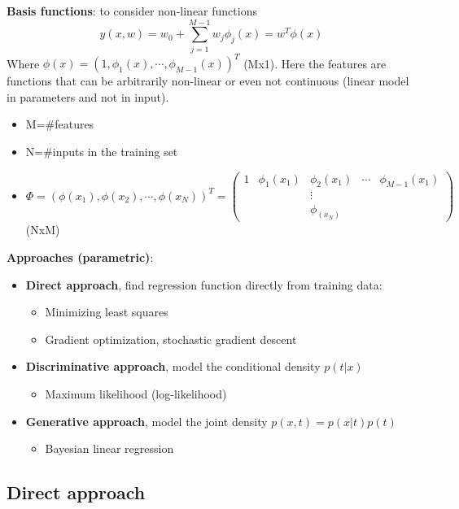     \textbf{Basis functions}: to consider non-linear functions
    $$y(x,w)=w_0+\sum_{j=1}^{M-1}w_j\phi_j(x)=w^T\phi(x)$$
    Where $\phi(x)=(1,\phi_1(x),\cdots,\phi_{M-1}(x))^T$ (Mx1). Here the features are functions that can be arbitrarily non-linear or even not continuous (linear model in parameters and not in input).
    \begin{itemize}
        \item M=\#features
        \item N=\#inputs in the training set
        \item
            $
            \Phi=(\phi(x_1),\phi(x_2),\cdots,\phi(x_N))^T=
            \begin{pmatrix}
                1 & \phi_1(x_1) & \phi_2(x_1) & \cdots & \phi_{M-1}(x_1) \\
                & & \vdots & & \\
                & & \phi_(x_N) & &
            \end{pmatrix}
            $ (NxM)
    \end{itemize}
    \textbf{Approaches (parametric)}:
    \begin{itemize}
        \item \textbf{Direct approach}, find regression function directly from training data:
        \begin{itemize}
            \item Minimizing least squares
            \item Gradient optimization, stochastic gradient descent
        \end{itemize}
        \item \textbf{Discriminative approach}, model the conditional density $p(t|x)$
        \begin{itemize}
            \item Maximum likelihood (log-likelihood)
        \end{itemize}
        \item \textbf{Generative approach}, model the joint density $p(x,t)=p(x|t)p(t)$
        \begin{itemize}
            \item Bayesian linear regression 
        \end{itemize}
    \end{itemize}

\subsection{Direct approach}
